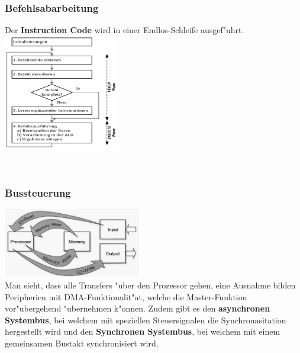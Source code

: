 \begin{minipage}[t]{8cm}
	\subsubsection{Befehlsabarbeitung}
	Der \textbf{Instruction Code} wird in einer Endlos-Schleife ausgef"uhrt.\\
	\includegraphics[width=5cm]{pics/Befehlablauf}
\end{minipage}
%
\begin{minipage}{0.5cm}
	\ \
\end{minipage}
%
\begin{minipage}[t]{10cm}
	\subsubsection{Bussteuerung}
	\includegraphics[width=6cm]{pics/Bus-Operationen}\\
	Man sieht, dass alle Transfers "uber den Prozessor gehen, eine Ausnahme bilden Peripherien mit DMA-Funktionalit"at, welche die Master-Funktion vor"ubergehend "ubernehmen k"onnen.
	Zudem gibt es den \textbf{asynchronen Systembus}, bei welchem mit speziellen Steuersignalen die Synchronasitation hergestellt wird und den \textbf{Synchronen Systembus}, bei welchem mit einem gemeinsamen Bustakt synchronisiert wird.
\end{minipage}
	
